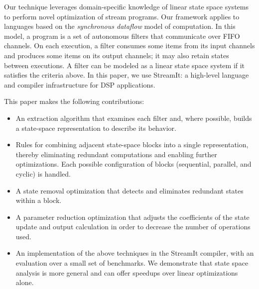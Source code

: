 Our technique leverages domain-specific knowledge of linear state
space systems to perform novel optimization of stream programs.  Our
framework applies to languages based on the {\it synchronous dataflow}
model of computation.  In this model, a program is a set of autonomous
filters that communicate over FIFO channels.  On each execution, a
filter consumes some items from its input channels and produces some
items on its output channels; it may also retain states between
executions.  A filter can be modeled as a linear state space system if
it satisfies the criteria above.  In this paper, we use StreamIt: a
high-level language and compiler infrastructure for DSP applications.

This paper makes the following contributions:

\begin{itemize}

\vspace{\itemshrink} \item An extraction algorithm that examines each
filter and, where possible, builds a state-space representation to
describe its behavior.

\vspace{\itemshrink} \item Rules for combining adjacent state-space
blocks into a single representation, thereby eliminating redundant
computations and enabling further optimizations.  Each possible
configuration of blocks (sequential, parallel, and cyclic) is handled.

\vspace{\itemshrink} \item A state removal optimization that detects
and eliminates redundant states within a block.

\vspace{\itemshrink} \item A parameter reduction optimization that
adjusts the coefficients of the state update and output calculation in
order to decrease the number of operations used.

\vspace{\itemshrink} \item An implementation of the above techniques
in the StreamIt compiler, with an evaluation over a small set of
benchmarks.  We demonstrate that state space analysis is more general
and can offer speedups over linear optimizations alone.

\vspace{\itemshrink} \end{itemize}

